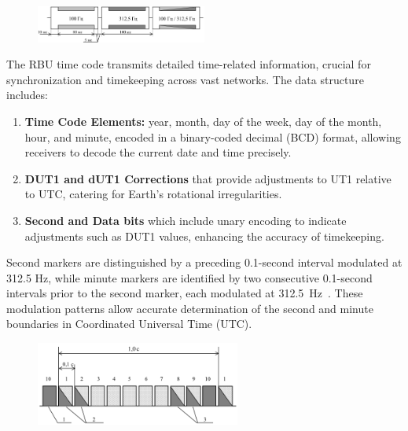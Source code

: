 \documentclass[12pt, a4paper]{extarticle}
\begin{document}
\begin{figure}[h]
    \centering
    \includegraphics[width=0.5\textwidth]{dxxxw}
    \captionsetup{width=0.8\textwidth}
    \label{fig:dxxxw}
\end{figure}

The RBU time code transmits
detailed time-related information, crucial for synchronization and timekeeping
across vast networks. The data structure includes:
\begin{enumerate}[noitemsep]
    \item \textbf{Time Code Elements:} year, month, day of the week, day of the
        month, hour, and minute, encoded in a binary-coded decimal (BCD)
        format, allowing receivers to decode the current date and time
        precisely.
    \item \textbf{DUT1 and dUT1 Corrections} that provide adjustments to UT1
        relative to UTC, catering for Earth's rotational irregularities.
    \item \textbf{Second and Data bits} which include unary encoding to
        indicate adjustments such as DUT1 values, enhancing the accuracy of
        timekeeping.
\end{enumerate}

Second markers are distinguished by a preceding 0.1-second interval modulated
at 312.5 Hz, while minute markers are identified by two consecutive 0.1-second
intervals prior to the second marker, each modulated at
312.5~Hz~\cite{vniiftri}. These modulation patterns allow accurate
determination of the second and minute boundaries in Coordinated Universal Time
(UTC).

\begin{figure}[H]
    \centering
    \includegraphics[width=0.6\textwidth]{dxxxw2}
    \captionsetup{width=0.8\textwidth}
    \label{fig:dxxxw2}
\end{figure}
\end{document}
